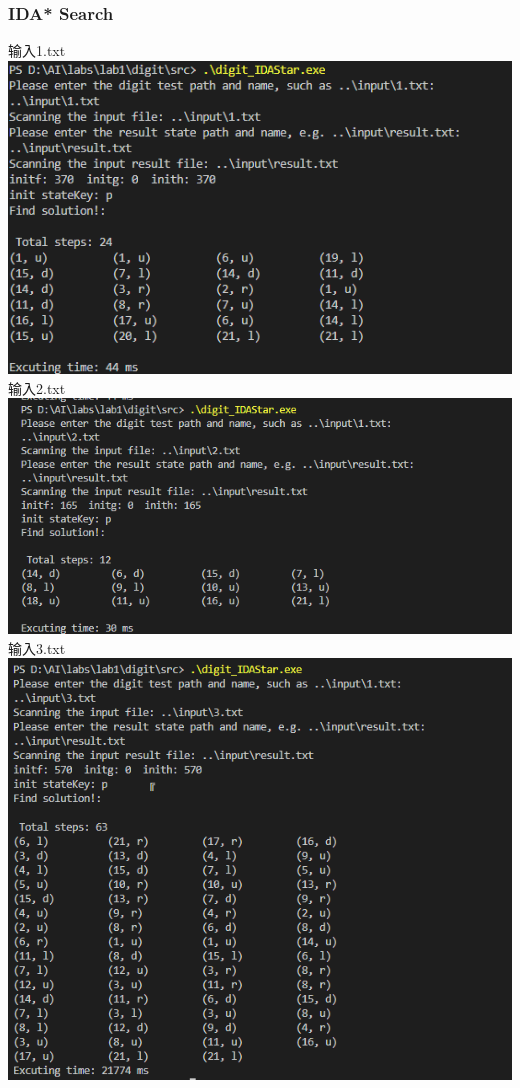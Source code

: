 \documentclass{article}
\begin{document}
	\subsubsection*{IDA* Search}
	输入1.txt\\
	\includegraphics*[scale = 0.6]{6.png}\\
	输入2.txt\\
	\includegraphics*[scale = 0.6]{7.png}\\
	输入3.txt\\
	\includegraphics*[scale = 0.6]{8.png}\\
\end{document}
